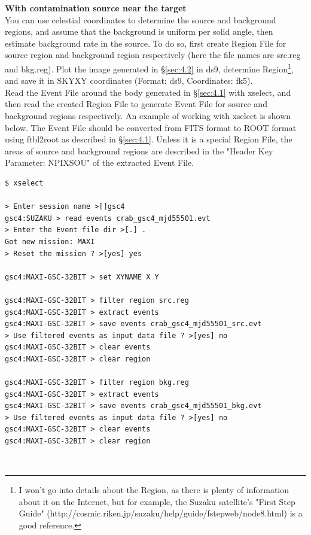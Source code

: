 \documentclass[10pt]{report}
\renewcommand{\_}{\textscale{.5}{\textbf{\textunderscore}}}
\begin{document}
\noindent \textbf{With contamination source near the target} \\

You can use celestial coordinates to determine the source and background regions, and assume that the background is uniform per solid angle, then estimate background rate in the source. To do so, first create Region File for source region and background region respectively (here the file names are src.reg and bkg.reg). Plot the image generated in \S\ref{sec:4.2} in ds9, determine Region\footnote{I won't go into details about the Region, as there is plenty of information about it on the Internet, but for example, the Suzaku satellite's "First Step Guide" (http://cosmic.riken.jp/suzaku/help/guide/fstep\_web/node8.html) is a good reference.}, and save it in SKYXY coordinates (Format: ds9, Coordinates: fk5). \\
\indent Read the Event File around the body generated in \S\ref{sec:4.1} with xselect, and then read the created Region File to generate Event File for source and background regions respectively. An example of working with xselect is shown below. The Event File should be converted from FITS format to ROOT format using ftbl2root as described in \S\ref{sec:4.1}. Unless it is a special Region File, the areas of source and background regions are described in the "Header Key Parameter: NPIXSOU" of the extracted Event File.\\

\begin{lstlisting}
$ xselect

> Enter session name >[]gsc4
gsc4:SUZAKU > read events crab_gsc4_mjd55501.evt
> Enter the Event file dir >[.] .
Got new mission: MAXI
> Reset the mission ? >[yes] yes

gsc4:MAXI-GSC-32BIT > set XYNAME X Y

gsc4:MAXI-GSC-32BIT > filter region src.reg
gsc4:MAXI-GSC-32BIT > extract events
gsc4:MAXI-GSC-32BIT > save events crab_gsc4_mjd55501_src.evt
> Use filtered events as input data file ? >[yes] no
gsc4:MAXI-GSC-32BIT > clear events
gsc4:MAXI-GSC-32BIT > clear region

gsc4:MAXI-GSC-32BIT > filter region bkg.reg
gsc4:MAXI-GSC-32BIT > extract events
gsc4:MAXI-GSC-32BIT > save events crab_gsc4_mjd55501_bkg.evt
> Use filtered events as input data file ? >[yes] no
gsc4:MAXI-GSC-32BIT > clear events
gsc4:MAXI-GSC-32BIT > clear region
\end{lstlisting}

\
\end{document}
